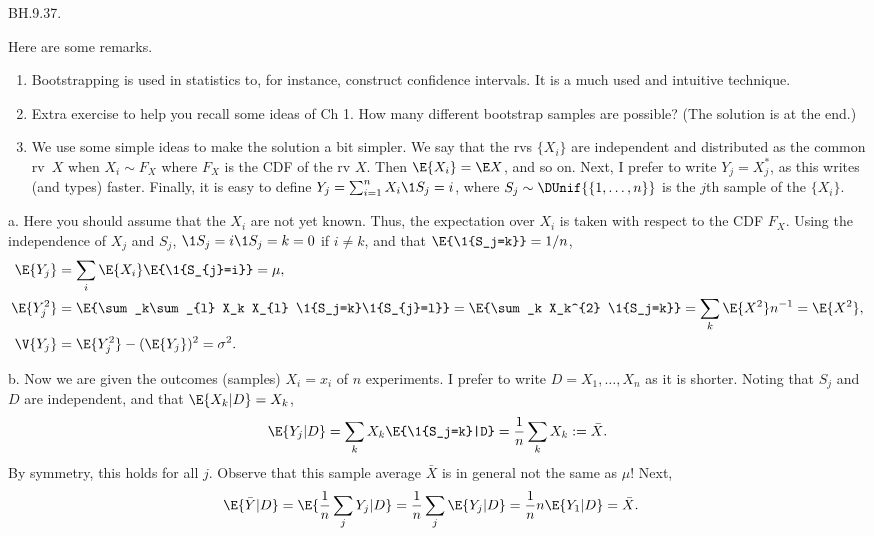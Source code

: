 
\setcounter{theorem}{36}
\begin{exercise} BH.9.37.
 \begin{solution}
Here are some remarks.
\begin{enumerate}
\item  Bootstrapping is used in statistics to, for instance, construct confidence intervals. It is a much used and intuitive technique.
\item Extra exercise to  help you recall some ideas of Ch 1. How many different bootstrap samples are possible? (The solution is at the end.)
\item  We use some simple ideas to make the solution a bit simpler. We say that the rvs $\{X_i\}$ are independent and  distributed as the common rv~$X$ when $X_i\sim F_X$ where $F_X$ is the CDF of the rv $X$. Then $\E{X_{i}}=\E X$, and so on.  Next,  I prefer to write $Y_{j}= X_j^{*}$, as this writes (and types) faster. Finally,  it is easy to define
$Y_j = \sum_{i=1}^n X_i\1{S_j = i}$, where $S_{j}\sim \DUnif{\{1, \ldots, n\}}$ is the \(j\)th sample of the $\{X_{i}\}$.
\end{enumerate}


a. Here you should assume that the $X_i$ are not yet known. Thus, the expectation over $X_i$ is taken with respect to the CDF $F_X$. Using the independence of $X_j$ and $S_j$, $\1{S_j=i}\1{S_j=k} = 0$ if $i\neq k$, and that $\E{\1{S_j=k}} = 1/n$,
\begin{align*}
\E{Y_j} &= \sum_i \E{X_i}\E{\1{S_{j}=i}} = \mu, \\
\E{Y_j^2}  &= \E{\sum_k\sum_{l} X_k X_{l} \1{S_j=k}\1{S_{j}=l}}
= \E{\sum_k X_k^{2}  \1{S_j=k}} =\sum_{k} \E{X^{2}} n^{-1} = \E{X^{2}}, \\
\V{Y_j}&= \E{Y_j^{2}}- (\E{Y_{j}})^{2} = \sigma^{2}.
\end{align*}

b. Now we are given the outcomes (samples) $X_i=x_i$ of $n$ experiments.
I prefer to write $D = X_{1}, \ldots, X_{n}$ as it is shorter.
Noting that $S_j$ and $D$ are independent, and that $\E{X_{k}|D} = X_{k}$,
\begin{align*}
  \E{Y_{j}|D} = \sum_k X_k \E{\1{S_j=k}|D} = \frac 1 n \sum_k X_k := \bar X.
\end{align*}
By symmetry, this holds for all $j$.
Observe that this sample average $\bar X$  is in general not the same as $\mu$!
Next,
\begin{align*}
\E{\bar Y|D} &= \E{\frac 1 n\sum_{j}Y_{j}|D} = \frac 1{n} \sum_j \E{Y_j|D} = \frac 1 n n \E{Y_1|D} = \bar X.
\end{align*}



\end{solution}
\end{exercise}
